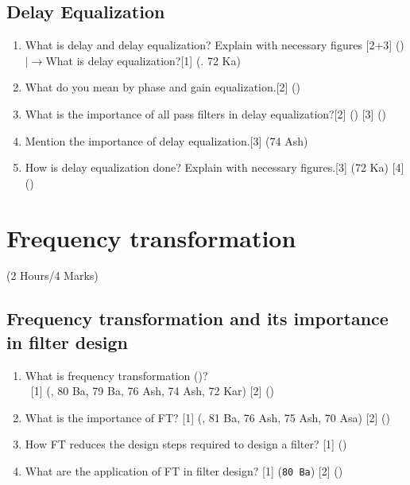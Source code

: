 \documentclass[12pt]{article}
\newcommand{\lb}{\\$\left|\rightarrow\right.$}
\newcommand{\enter}{\\\textcolor{white}{1}}
\begin{document}
\subsection{Delay Equalization}
\begin{enumerate}
\item What is delay and delay equalization? Explain with necessary figures \hfill[2+3] ()
\lb What is delay equalization?\hfill[1] (. 72 Ka)

\item What do you mean by phase and gain equalization.\hfill[2] ()

\item What is the importance of all pass filters in delay equalization?\hfill[2] () [3] ()

\item Mention the importance of delay equalization.\hfill[3] (74 Ash)

\item How is delay equalization done? Explain with necessary figures.\hfill[3] (72 Ka) [4] ()
\end{enumerate}

\pagebreak
\section{Frequency transformation}
\begin{center}(2 Hours/4 Marks)\end{center}
\subsection{Frequency transformation and its importance in filter design}
\begin{enumerate}
	\item What is frequency transformation ()?
	\enter \hfill [1] (, 80 Ba, 79 Ba, 76 Ash, 74 Ash, 72 Kar) [2] ()
	
	\item What is the importance of FT? \hfill [1] (, 81 Ba, 76 Ash, 75 Ash, 70 Asa) [2] ()
	
	\item How FT reduces the design steps required to design a filter? \hfill [1] ()
	
	\item What are the application of FT in filter design? \hfill[1] (\texttt{80 Ba}) [2] ()
\end{enumerate}
\end{document}

